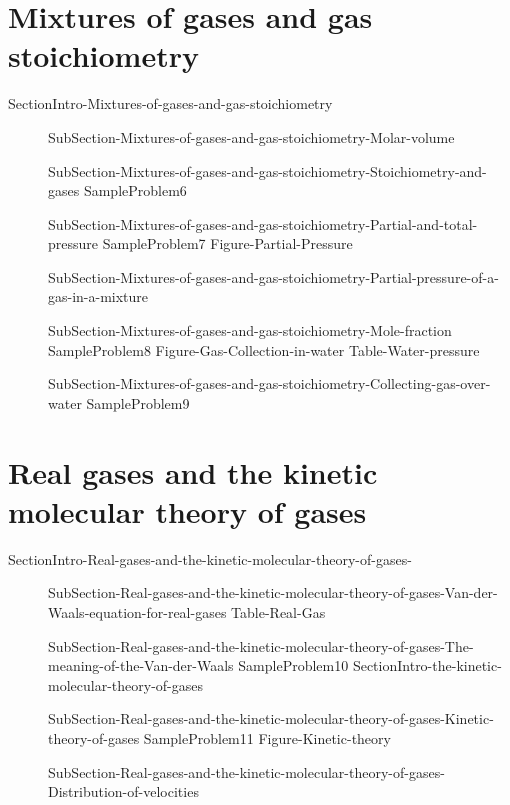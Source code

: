 \documentclass[main.tex]{subfiles}
\begin{document}
 \section{Mixtures of gases and gas stoichiometry}{SectionIntro-Mixtures-of-gases-and-gas-stoichiometry}
\sloppy 
\begin{description}
 \item[] {SubSection-Mixtures-of-gases-and-gas-stoichiometry-Molar-volume}
\item[]  {SubSection-Mixtures-of-gases-and-gas-stoichiometry-Stoichiometry-and-gases}
{SampleProblem6}
 \item[] 
{SubSection-Mixtures-of-gases-and-gas-stoichiometry-Partial-and-total-pressure}
{SampleProblem7}
 {Figure-Partial-Pressure}
\item[]  {SubSection-Mixtures-of-gases-and-gas-stoichiometry-Partial-pressure-of-a-gas-in-a-mixture}
\item[]  {SubSection-Mixtures-of-gases-and-gas-stoichiometry-Mole-fraction}
{SampleProblem8}
 {Figure-Gas-Collection-in-water}
{Table-Water-pressure}
\item[]  {SubSection-Mixtures-of-gases-and-gas-stoichiometry-Collecting-gas-over-water}
{SampleProblem9}
\end{description}


 \section{Real gases and the kinetic molecular theory of gases }
{SectionIntro-Real-gases-and-the-kinetic-molecular-theory-of-gases-}
\sloppy 
\begin{description}
 \item[] {SubSection-Real-gases-and-the-kinetic-molecular-theory-of-gases-Van-der-Waals-equation-for-real-gases}
{Table-Real-Gas}		
\item[]  {SubSection-Real-gases-and-the-kinetic-molecular-theory-of-gases-The-meaning-of-the-Van-der-Waals}
{SampleProblem10}
{SectionIntro-the-kinetic-molecular-theory-of-gases}
 \item[] 
{SubSection-Real-gases-and-the-kinetic-molecular-theory-of-gases-Kinetic-theory-of-gases}
{SampleProblem11}
 {Figure-Kinetic-theory}
 \item[] {SubSection-Real-gases-and-the-kinetic-molecular-theory-of-gases-Distribution-of-velocities}
\end{description}

\clearpage\thispagestyle{empty}\mbox{}\clearpage
\end{document}

